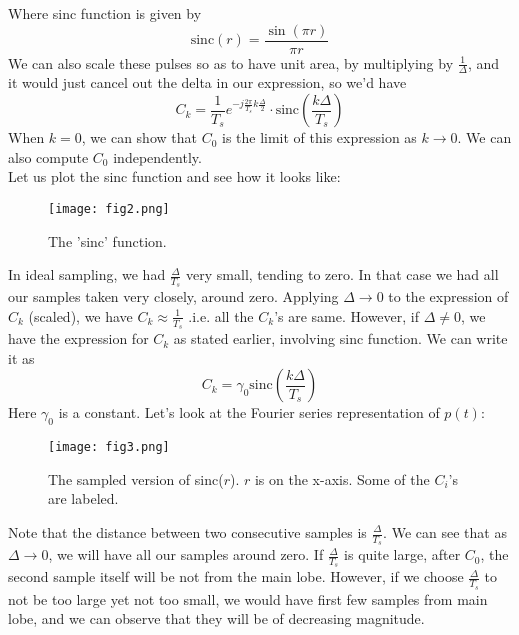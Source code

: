 Where sinc function is given by
\begin{equation}
\text{sinc}(r)=\frac{\sin(\pi r)}{\pi r}\nonumber
\end{equation}
We can also scale these pulses so as to have unit area, by multiplying by $\frac{1}{\Delta}$, and it would just cancel out the delta in our expression, so we'd have 
\begin{equation}
C_{k}=\frac{1}{T_{s}}e^{-j\frac{2\pi}{T_{s}}k\frac{\Delta}{2}}\cdot \text{sinc}\left(\frac{k\Delta}{T_{s}}\right)\nonumber
\end{equation}
When $k=0$, we can show that $C_{0}$ is the limit of this expression as $k\rightarrow0$. We can also compute $C_{0}$ independently.\\
Let us plot the sinc function and see how it looks like:\\
\begin{figure}[htb]
\centering
\texttt{[image: fig2.png]}
\caption{\label{fig:fig2}The 'sinc' function.}
\end{figure}
In ideal sampling, we had $\frac{\Delta}{T_{s}}$ very small, tending to zero. In that case we had all our samples taken very closely, around zero. Applying $\Delta\rightarrow0$ to the expression of $C_{k}$ (scaled), we have $C_{k}\approx\frac{1}{T_{s}}$ .i.e. all the $C_{k}$'s are same. However, if $\Delta\ne0$, we have the expression for $C_{k}$ as stated earlier, involving sinc function. We can write it as 
\begin{equation}
C_{k}=\gamma_0\text{sinc}\left(\frac{k\Delta}{T_{s}}\right)\nonumber
\end{equation}
Here $\gamma_0$ is a constant. Let's look at the Fourier series representation of $p(t)$:
\begin{figure}[htb]
\centering
\texttt{[image: fig3.png]}
\caption{\label{fig:fig3}The sampled version of sinc($r$). $r$ is on the x-axis. Some of the $C_{i}$'s are labeled.}
\end{figure}
Note that the distance between two consecutive samples is $\frac{\Delta}{T_{s}}$. We can see that as $\Delta\rightarrow0$, we will have all our samples around zero. If $\frac{\Delta}{T_{s}}$ is quite large, after $C_{0}$, the second sample itself will be not from the main lobe. However, if we choose $\frac{\Delta}{T_{s}}$ to not be too large yet not too small, we would have first few samples from main lobe, and we can observe that they will be of decreasing magnitude.
